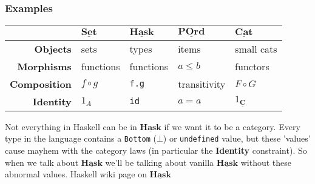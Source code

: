 \documentclass[10pt]{beamer}
\newcommand{\Cat}[1]{\ensuremath{\underline{\mathbf{#1}}}}
\theoremstyle{definition}
\theoremstyle{remark}
\numberwithin{equation}{section}
\begin{document}
\begin{frame}[fragile]
  \frametitle{Examples}

  \begin{center}
    \begin{tabular}{r l l l l}\toprule
    & $\Cat{Set}$ & $\Cat{Hask}$ & $\Cat{POrd}$ & $\Cat{Cat}$ \\\midrule
    \textbf{Objects} & sets & types & items & small cats \\
    \textbf{Morphisms} & functions & functions & $a \leq b$ & functors \\
    \textbf{Composition} & $f \circ g$ & \lstinline!f.g! & transitivity & $F \circ G$ \\
    \textbf{Identity} & $1_A$ & {\lstinline!id!} & $a = a$ & $1_{\Cat{C}}$ \\\bottomrule
  \end{tabular}
  \end{center}

  Not everything in Haskell can be in $\Cat{Hask}$ if we want it to be a category. Every type in the language contains a \lstinline{Bottom} ($\bot$) or \lstinline{undefined} value, but these 'values' cause mayhem with the category laws (in particular the \textbf{Identity} constraint). So when we talk about \Cat{Hask} we'll be talking about vanilla \Cat{Hask} without these abnormal values.
  {\small Haskell wiki page on \Cat{Hask}}
\end{frame}
\end{document}
